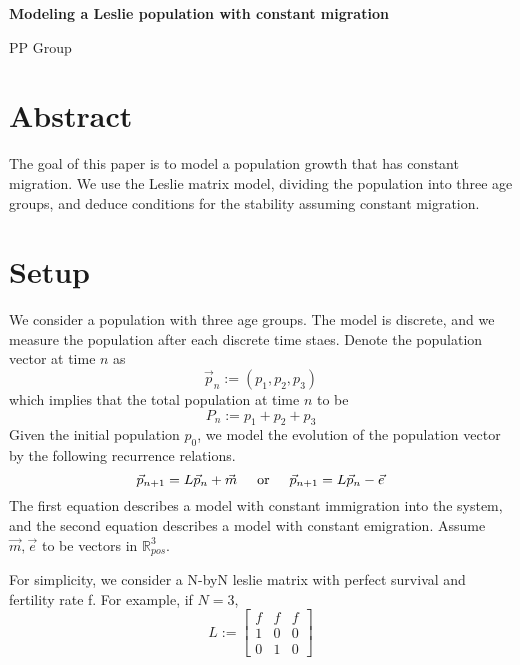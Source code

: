 \documentclass{article}
\newcommand{\textOr}{
    {
        \hspace{5mm}
        \textrm{or}
        \hspace{5mm}
    }
}
\begin{document}
\begin{center}
    \Large
    \textbf{Modeling a Leslie population with constant migration }

    \large
    PP Group
\end{center}

\section{Abstract}

The goal of this paper is to model a population growth that 
has constant migration. We use the Leslie matrix model, dividing 
the population into three age groups, and deduce conditions 
for the stability assuming constant migration. 

\section{Setup}

We consider a population with three age groups. 
The model is discrete, and we measure the population 
after each discrete time staes. Denote the 
population vector at time $n$ as 
\[
    \vec p _ n := (p_1, p_2, p_3)
\]
which implies that the total population at time $n$ to be 
\[
    P_n := p_1 + p_2 + p_3
\]
Given the initial population $p_0$, we model the evolution of 
the population vector by the following recurrence relations. 
\[
    \vec p_{n + 1} = L \vec p_n + \vec m
    \textOr
    \vec p_{n + 1} = L \vec p_n - \vec e
\]
The first equation describes a model with constant immigration 
into the system, and the second equation describes a model 
with constant emigration. Assume $\vec m, \vec e$ to be vectors 
in $\mathbb R_{pos}^3$. 


\begin{comment}
The matrix $L$ is a 3-by-3 leslie matrix written as 
\[
    L := \begin{bmatrix}
        0 & f & f \\ 
        s & 0 & 0 \\
        0 & s & 0 
    \end{bmatrix}
\]
where $s, f$ are survival and fertility rates respectively. 
We naturally assume $0 \leq s \leq 1$ and $f \geq 0$

\end{comment}


For simplicity, we consider a N-byN leslie matrix with perfect survival and 
fertility rate f. For example, if $N = 3$, 
\begin{equation}
    L := \begin{bmatrix}
        f & f & f \\ 
        1 & 0 & 0 \\
        0 & 1 & 0 
    \end{bmatrix}
\end{equation}
\end{document}
